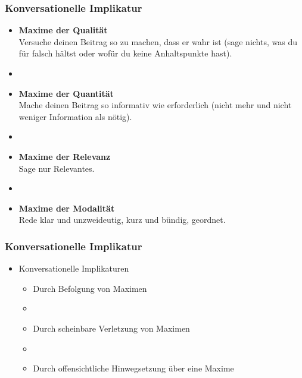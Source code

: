 
\begin{frame}
\frametitle{Konversationelle Implikatur}

\begin{itemize}
	\item \textbf{Maxime der Qualität}\\
Versuche deinen Beitrag so zu machen, dass er wahr ist (sage nichts, was du für falsch hältst oder wofür du keine Anhaltspunkte hast).
	\item[]
	\item \textbf{Maxime der Quantität}\\
Mache deinen Beitrag so informativ wie erforderlich (nicht mehr und nicht weniger Information als nötig).
	\item[]
	\item \textbf{Maxime der Relevanz}\\
Sage nur Relevantes.
	\item[]
	\item \textbf{Maxime der Modalität}\\
Rede klar und unzweideutig, kurz und bündig, geordnet.
\end{itemize}

\end{frame}



\begin{frame}
\frametitle{Konversationelle Implikatur}

\begin{itemize}
	\item Konversationelle Implikaturen
	
\vspace{5mm}
	
	\begin{itemize}
		\item Durch Befolgung von Maximen
		\item[]
		\item Durch scheinbare Verletzung von Maximen
		\item[]
		\item Durch offensichtliche Hinwegsetzung über eine Maxime
	\end{itemize}
	
\end{itemize}

\end{frame}



